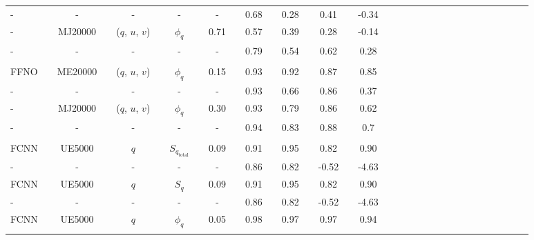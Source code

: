 \begin{table}[H]
\begin{tabular}{llclclclclclclclclclclclclclclcl}
-     		&  & -                &  & -				&  & -        &  & -              &  & 0.68            &  & 0.28            &  & 0.41           &  & -0.34             \\ 
-     		&  & MJ20000          &  & ($q$, $u$, $v$)  &  & $\phi_q$ &  & 0.71          &  & 0.57            &  & 0.39            &  & 0.28           &  & -0.14             \\ \rowcolor{Gray}
-     		&  & -                &  & -				&  & -        &  & -              &  & 0.79            &  & 0.54            &  & 0.62           &  & 0.28            \\ 
\hline \\[-1.4em]
FFNO        &  & ME20000          &  & ($q$, $u$, $v$)  &  & $\phi_q$ &  & 0.15          &  & 0.93            &  & 0.92            &  & 0.87           &  & 0.85           \\ \rowcolor{Gray}
-     		&  & -                &  & -				&  & -        &  & -              &  & 0.93            &  & 0.66            &  & 0.86           &  & 0.37           \\ 
-     		&  & MJ20000          &  & ($q$, $u$, $v$)  &  & $\phi_q$ &  & 0.30          &  & 0.93            &  & 0.79            &  & 0.86           &  & 0.62           \\ \rowcolor{Gray}
-     		&  & -                &  & -				&  & -        &  & -              &  & 0.94            &  & 0.83            &  & 0.88           &  & 0.7           \\ [0.2em]
\hline \\[-1.4em]
FCNN      &  & UE5000      &  & $q$       &   & $S_{q_{\text{total}}}$     &  & 0.09  &  & 0.91       &  & 0.95     &  & 0.82      &  & 0.90         \\ \rowcolor{Blue}
-     		&  & -                  &  & -            &   &  -                                       &  &  -           &  & 0.86      &  & 0.82     &  & -0.52     &  & -4.63        \\ 
FCNN      &  & UE5000      &  & $q$       &   & $S_q$                               &  & 0.09      &  & 0.91       &  & 0.95     &  & 0.82      &  & 0.90             \\ \rowcolor{Blue}
-     		&  & -                  &  & -            &   &  -                                       &  &  -           &  & 0.86      &  & 0.82      &  & -0.52    &  & -4.63          \\ 
FCNN      &  & UE5000      &  & $q$       &   & $\phi_q $                          &  & 0.05      &  & 0.98      &  & 0.97      &  & 0.97      &  & 0.94             \\ \rowcolor{Blue}

\end{tabular}
\end{table}
